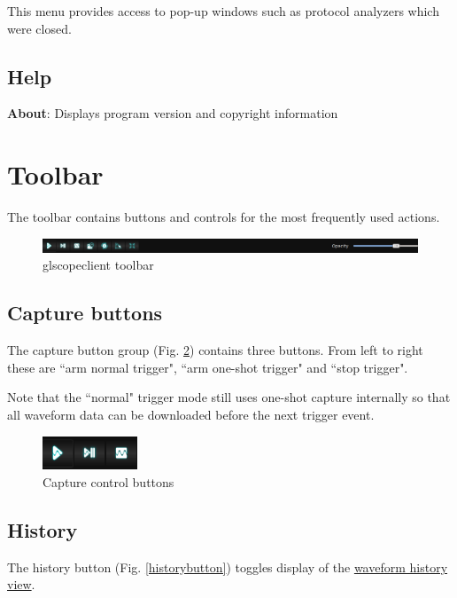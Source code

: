 This menu provides access to pop-up windows such as protocol analyzers which were closed.

\subsection{Help}

\textbf{About}: Displays program version and copyright information

\section{Toolbar}

The toolbar contains buttons and controls for the most frequently used actions.

\begin{figure}[h]
\centering
\includegraphics[width=16cm]{images/toolbar.png}
\caption{glscopeclient toolbar}
\label{toolbar}
\end{figure}

\subsection{Capture buttons}

The capture button group (Fig. \ref{capturebuttons}) contains three buttons. From left to right these are ``arm
normal trigger", ``arm one-shot trigger" and ``stop trigger".

Note that the ``normal" trigger mode still uses one-shot capture internally so that all waveform data can be downloaded
before the next trigger event.

\begin{figure}[h]
\centering
\includegraphics[height=1cm]{images/capture-icons.png}
\caption{Capture control buttons}
\label{capturebuttons}
\end{figure}

\subsection{History}

The history button (Fig. \ref{historybutton}) toggles display of the \hyperref[sec:history]{waveform history view}.

